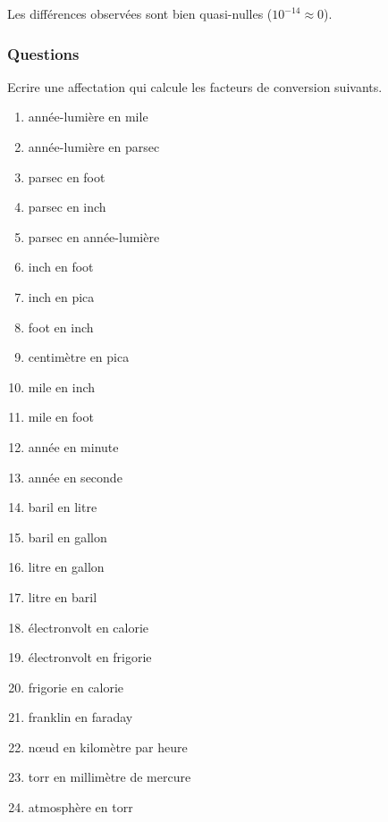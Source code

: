 \noindent
Les différences observées sont bien quasi-nulles ($10^{-14} \approx 0$).

\subsubsection{Questions}

Ecrire une affectation qui calcule les facteurs de conversion suivants.

\noindent\begin{minipage}[t]{7cm}
\begin{enumerate}
\item année-lumière en mile
\item année-lumière en parsec
\item parsec en foot
\item parsec en inch
\item parsec en année-lumière
\item inch en foot
\end{enumerate}
\end{minipage}
\hfill
\begin{minipage}[t]{7cm}
\begin{enumerate}\setcounter{enumi}{6}
\item inch en pica
\item foot en inch
\item centimètre en pica
\item mile en inch
\item mile en foot
\item année en minute
\end{enumerate}
\end{minipage}

\noindent\begin{minipage}[t]{7cm}
\begin{enumerate}\setcounter{enumi}{12}
\item année en seconde
\item baril en litre
\item baril en gallon
\item litre en gallon
\item litre en baril
\item électronvolt en calorie
\end{enumerate}
\end{minipage}
\hfill
\begin{minipage}[t]{7cm}
\begin{enumerate}\setcounter{enumi}{18}
\item électronvolt en frigorie
\item frigorie en calorie
\item franklin en faraday
\item n\oe ud en kilomètre par heure
\item torr en millimètre de mercure
\item atmosphère en torr
\end{enumerate}
\end{minipage}

